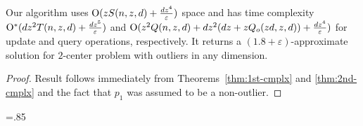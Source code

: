 \documentclass[envcountsame]{cls/cccg15}
\newcommand{\cO}{\ensuremath{{\rm O}}}
\newcommand{\eps}{\varepsilon}
\begin{document}
\begin{theorem}
Our algorithm uses $\cO(zS(n, z, d) + \frac{dz^4}{\eps})$ space and has time complexity $\cO^*(dz^2T(n,z,d) + \frac{dz^5}{\eps})$ and $\cO(z^2Q(n,z,d) + dz^2(dz+zQ_o(zd,z,d)) + \frac{dz^4}{\eps})$ for update and query operations, respectively. It returns a $(1.8 + \eps)$-approximate solution for $2$-center problem with outliers in any dimension.
\end{theorem}
\begin{proof}
Result follows immediately from Theorems~\ref{thm:1st-cmplx} and \ref{thm:2nd-cmplx} and the fact that $p_1$ was assumed to be a non-outlier.
\end{proof}


\small
\baselineskip=.85\baselineskip


\end{document}
